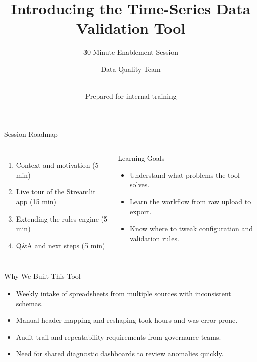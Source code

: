 \documentclass[aspectratio=169]{beamer}
\title{Introducing the Time-Series Data Validation Tool}
\subtitle{30-Minute Enablement Session}
\author{Data Quality Team}
\date{\\[0.5ex]Prepared for internal training}
\begin{document}
\begin{frame}[plain]
  \titlepage
\end{frame}

\begin{frame}{Session Roadmap}
  \begin{columns}[T]
      \begin{enumerate}
        \item Context and motivation (5 min)
        \item Live tour of the Streamlit app (15 min)
        \item Extending the rules engine (5 min)
        \item Q\&A and next steps (5 min)
      \end{enumerate}
      \begin{block}{Learning Goals}
        \begin{itemize}
          \item Understand what problems the tool solves.
          \item Learn the workflow from raw upload to export.
          \item Know where to tweak configuration and validation rules.
        \end{itemize}
      \end{block}
  \end{columns}
\end{frame}

\begin{frame}{Why We Built This Tool}
  \begin{itemize}
    \item Weekly intake of spreadsheets from multiple sources with inconsistent schemas.
    \item Manual header mapping and reshaping took hours and was error-prone.
    \item Audit trail and repeatability requirements from governance teams.
    \item Need for shared diagnostic dashboards to review anomalies quickly.
  \end{itemize}
\end{frame}
\end{document}
